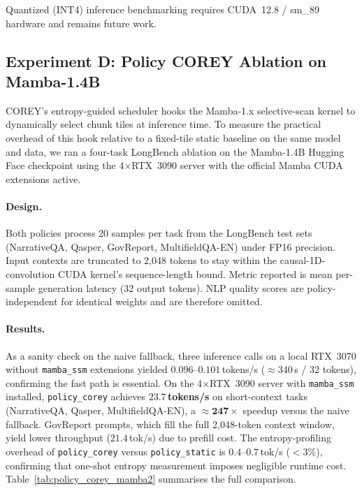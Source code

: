 Quantized (INT4) inference benchmarking requires CUDA~12.8 / sm\_89 hardware
and remains future work.

\subsection{Experiment D: Policy COREY Ablation on Mamba-1.4B}
\label{sec:exp_policy_corey_mamba2}

COREY's entropy-guided scheduler hooks the Mamba-1.x selective-scan kernel to
dynamically select chunk tiles at inference time. To measure the practical
overhead of this hook relative to a fixed-tile static baseline on the same
model and data, we ran a four-task LongBench ablation on the Mamba-1.4B
Hugging Face checkpoint using the 4$\times$RTX~3090 server with the official
Mamba CUDA extensions active.

\paragraph{Design.}
Both policies process 20 samples per task from the LongBench test sets
(NarrativeQA, Qasper, GovReport, MultifieldQA-EN) under FP16 precision.
Input contexts are truncated to 2{,}048 tokens to stay within the
causal-1D-convolution CUDA kernel's sequence-length bound.
Metric reported is mean per-sample generation latency (32 output tokens).
NLP quality scores are policy-independent for identical weights and are
therefore omitted.

\paragraph{Results.}
As a sanity check on the naive fallback, three inference calls on a local
RTX~3070 without \texttt{mamba\_ssm} extensions yielded $0.096$--$0.101$\,tokens/s
($\approx340$\,s / 32 tokens), confirming the fast path is essential.
On the 4$\times$RTX~3090 server with \texttt{mamba\_ssm} installed,
\texttt{policy\_corey} achieves $\mathbf{23.7}$\,\textbf{tokens/s} on
short-context tasks (NarrativeQA, Qasper, MultifieldQA-EN),
a $\approx\mathbf{247}\times$ speedup versus the naive fallback.
GovReport prompts, which fill the full 2{,}048-token context window,
yield lower throughput ($21.4$\,tok/s) due to prefill cost.
The entropy-profiling overhead of \texttt{policy\_corey} versus
\texttt{policy\_static} is $0.4$--$0.7$\,tok/s ($<3\%$), confirming that
one-shot entropy measurement imposes negligible runtime cost.
Table~\ref{tab:policy_corey_mamba2} summarises the full comparison.

